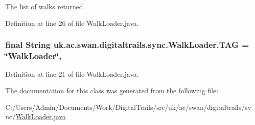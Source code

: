 The list of walks returned. 



Definition at line 26 of file Walk\+Loader.\+java.

\hypertarget{classuk_1_1ac_1_1swan_1_1digitaltrails_1_1sync_1_1_walk_loader_aa1258f0cd574d97f8f930ebd74afa4a6}{
\subsubsection[{T\+A\+G}]{\setlength{\rightskip}{0pt plus 5cm}final String uk.\+ac.\+swan.\+digitaltrails.\+sync.\+Walk\+Loader.\+T\+A\+G = \char`\"{}Walk\+Loader\char`\"{}\hspace{0.3cm}{\ttfamily [static]}, {\ttfamily [private]}}}\label{classuk_1_1ac_1_1swan_1_1digitaltrails_1_1sync_1_1_walk_loader_aa1258f0cd574d97f8f930ebd74afa4a6}


Definition at line 21 of file Walk\+Loader.\+java.



The documentation for this class was generated from the following file\+:\begin{DoxyCompactItemize}
\item 
C\+:/\+Users/\+Admin/\+Documents/\+Work/\+Digital\+Trails/src/uk/ac/swan/digitaltrails/sync/\hyperlink{_walk_loader_8java}{Walk\+Loader.\+java}\end{DoxyCompactItemize}
